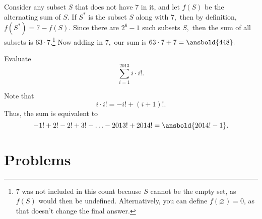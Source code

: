\documentclass[blue,onecol]{shooting}
\begin{document}
\begin{sol}
Consider any subset $S$ that does not have $7$ in it, and let $f(S)$ be the alternating sum of $S$. If $S^{*}$ is the subset $S$ along with $7,$ then by definition, $f(S^*)=7-f(S).$ Since there are $2^6-1$ such subsets $S,$ then the sum of all subsets  is $63\cdot 7.$\footnote{$7$ was not included in this count because $S$ cannot be the empty set, as $f(S)$ would then be undefined. Alternatively, you can define $f(\varnothing)=0$, as that doesn't change the final answer.} Now adding in $7,$ our sum is $63\cdot 7+7=\ansbold{448}.$
\end{sol}

\begin{exam}[LMT 2014/I15]
Evaluate
\[\sum_{i=1}^{2013} i\cdot i!.\]
\end{exam}

\begin{sol}
Note that
\[i\cdot i! = -i!+(i+1)!.\]
Thus, the sum is equivalent to
\[-1!+2!-2!+3!-\ldots-2013!+2014! = \ansbold{2014!-1}.\]
\end{sol}

\pagebreak

\section{Problems}









\end{document}
